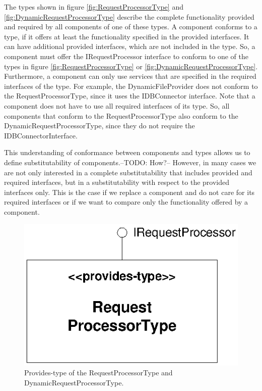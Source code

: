 The types shown in figure \ref{fig:RequestProcessorType} and \ref{fig:DynamicRequestProcessorType} describe the complete functionality provided and required by all components of one of these types. A component conforms to a type, if it offers at least the functionality specified in the provided interfaces. It can have additional provided interfaces, which are not included in the type. So, a component must offer the IRequestProcessor interface to conform to one of the types in figure \ref{fig:RequestProcessorType} or \ref{fig:DynamicRequestProcessorType}. Furthermore, a component can only use services that are specified in the required interfaces of the type. For example, the DynamicFileProvider does not conform to the RequestProcessorType, since it uses the IDBConnector interface. Note that a component does not have to use all required interfaces of its type. So, all components that conform to the RequestProcessorType also conform to the DynamicRequestProcessorType, since they do not require the IDBConnectorInterface. 

This understanding of conformance between components and types allows us to define substitutability of components.--TODO: How?-- However, in many cases we are not only interested in a complete substitutability that includes provided and required interfaces, but in a substitutability with respect to the provided interfaces only. This is the case if we replace a component and do not care for its required interfaces or if we want to compare only the functionality offered by a component. 



\begin{figure}[htbp]
\centering
\includegraphics[scale=1.0]{example/ProvidesType}
\caption{Provides-type of the RequestProcessorType and DynamicRequestProcessorType.}
\label{fig:ProvidesType}
\end{figure}

